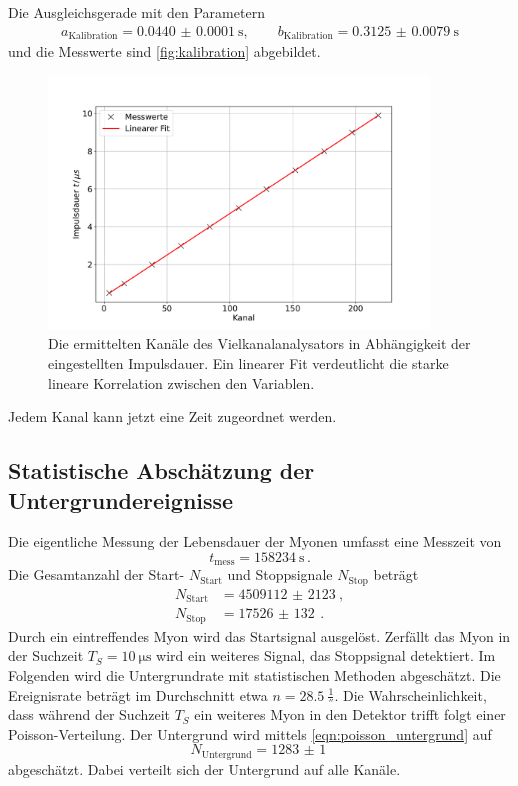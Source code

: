 Die Ausgleichsgerade mit den Parametern
\begin{align*}
    a_\text{Kalibration} = \qty{0.0440(00001)}{\second}, \qquad b_\text{Kalibration} = \qty{0.3125(00079)}{\second}
\end{align*}
und die Messwerte sind \autoref{fig:kalibration} abgebildet.
\begin{figure}
    \centering
    \includegraphics[width=0.9\textwidth]{content/plots/calibration.pdf}
    \caption{Die ermittelten Kanäle des Vielkanalanalysators in Abhängigkeit der eingestellten Impulsdauer.
    Ein linearer Fit verdeutlicht die starke lineare Korrelation zwischen den Variablen.
    }
    \label{fig:kalibration}
\end{figure}
Jedem Kanal kann jetzt eine Zeit zugeordnet werden.
\FloatBarrier

\subsection{Statistische Abschätzung der Untergrundereignisse}
\label{sec:untergrund}
Die eigentliche Messung der Lebensdauer der Myonen umfasst eine Messzeit von
\begin{equation*}
    t_\text{mess} = \qty{158234}{\second} \,.
\end{equation*}
Die Gesamtanzahl der Start- $N_\text{Start}$ und Stoppsignale $N_\text{Stop}$ beträgt
\begin{align*}
    N_\text{Start} &= \qty{4509112(2123)}{}, \\
    N_\text{Stop} &= \qty{17526(132)}{} \,.
\end{align*}
Durch ein eintreffendes Myon wird das Startsignal ausgelöst.
Zerfällt das Myon in der Suchzeit $T_S = \qty{10}{\micro\second}$ wird ein weiteres Signal, das Stoppsignal detektiert.
Im Folgenden wird die Untergrundrate mit statistischen Methoden abgeschätzt.
Die Ereignisrate beträgt im Durchschnitt etwa $n = \qty{28.5}{\frac{1}{\second}}$.
Die Wahrscheinlichkeit, dass während der Suchzeit $T_S$ ein weiteres Myon in den Detektor trifft folgt einer Poisson-Verteilung.  
Der Untergrund wird mittels \autoref{eqn:poisson_untergrund} auf
\begin{equation}
    N_\text{Untergrund} = \qty{1283(1)}{}
    \label{eqn:untergrund}
\end{equation}
abgeschätzt.
Dabei verteilt sich der Untergrund auf alle Kanäle.
\FloatBarrier

